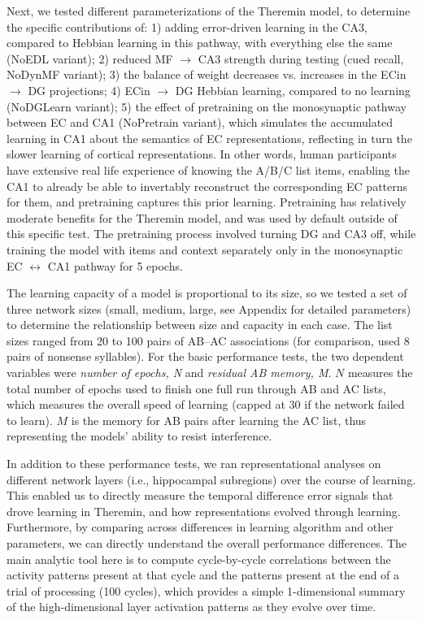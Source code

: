 \documentclass[11pt,twoside]{article}
\newif\myifpdf
\begin{document}
Next, we tested different parameterizations of the Theremin model, to determine the specific contributions of: 1) adding error-driven learning in the CA3, compared to Hebbian learning in this pathway, with everything else the same (NoEDL variant); 2) reduced MF $\rightarrow$ CA3 strength during testing (cued recall, NoDynMF variant); 3) the balance of weight decreases vs. increases in the ECin $\rightarrow$ DG projections; 4) ECin $\rightarrow$ DG Hebbian learning, compared to no learning (NoDGLearn variant); 5) the effect of pretraining on the monosynaptic pathway between EC and CA1 (NoPretrain variant), which simulates the accumulated learning in CA1 about the semantics of EC representations, reflecting in turn the slower learning of cortical representations. In other words, human participants have extensive real life experience of knowing the A/B/C list items, enabling the CA1 to already be able to invertably reconstruct the corresponding EC patterns for them, and pretraining captures this prior learning.  Pretraining has relatively moderate benefits for the Theremin model, and was used by default outside of this specific test.  The pretraining process involved turning DG and CA3 off, while training the model with items and context separately only in the monosynaptic EC $\leftrightarrow$ CA1 pathway for 5 epochs. 

The learning capacity of a model is proportional to its size, so we tested a set of three network sizes (small, medium, large, see Appendix for detailed parameters) to determine the relationship between size and capacity in each case.  The list sizes ranged from 20 to 100 pairs of AB--AC associations (for comparison, \citet{BarnesUnderwood59} used 8 pairs of nonsense syllables).  For the basic performance tests, the two dependent variables were \emph{number of epochs, N} and \emph{residual AB memory, M}.  $N$ measures the total number of epochs used to finish one full run through AB and AC lists, which measures the overall speed of learning (capped at 30 if the network failed to learn). $M$ is the memory for AB pairs after learning the AC list, thus representing the models' ability to resist interference.

In addition to these performance tests, we ran representational analyses on different network layers (i.e., hippocampal subregions) over the course of learning.  This enabled us to directly measure the temporal difference error signals that drove learning in Theremin, and how representations evolved through learning.  Furthermore, by comparing across differences in learning algorithm and other parameters, we can directly understand the overall performance differences.  The main analytic tool here is to compute cycle-by-cycle correlations between the activity patterns present at that cycle and the patterns present at the end of a trial of processing (100 cycles), which provides a simple 1-dimensional summary of the high-dimensional layer activation patterns as they evolve over time.
\end{document}
